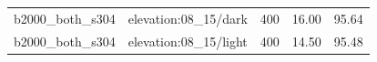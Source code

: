 \begin{longtable}{l>{\raggedright\arraybackslash}p{.42\linewidth}rrr}
b2000\_\allowbreak{}both\_\allowbreak{}s304 & %
elevation:08\_\allowbreak{}15/dark & %
400 & %
16.00 & %
95.64 \\ %

b2000\_\allowbreak{}both\_\allowbreak{}s304 & %
elevation:08\_\allowbreak{}15/light & %
400 & %
14.50 & %
95.48 \\ %


\end{longtable}
